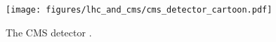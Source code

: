 \begin{figure}[hbtp]
\centering
\texttt{[image: figures/lhc\_and\_cms/cms\_detector\_cartoon.pdf]}
\caption{The CMS detector \cite{cms_detector_cartoon}.}
\label{cms_detector_cartoon}
\end{figure}